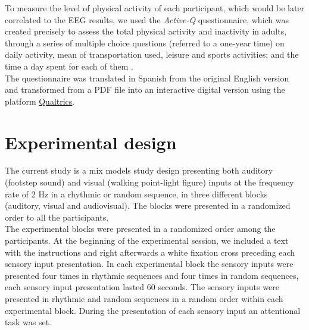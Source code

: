 To measure the level of physical activity of each participant, which would be later correlated to the EEG results, we used the \textit{Active-Q} questionnaire, which was created precisely to assess the total physical activity and inactivity in adults, through a series of multiple choice questions (referred to a one-year time) on daily activity, mean of transportation used, leisure and sports activities; and the time a day spent for each of them \parencite{Bonn_2012}. \\
The questionnaire was translated in Spanish from the original English version and transformed from a PDF file into an interactive digital version using the platform \href{https://www.qualtrics.com/uk/?rid=ip&prevsite=en&newsite=uk&geo=ES&geomatch=uk}{Qualtrics}. 

\section{Experimental design}
The current study is a mix models study design presenting both auditory (footstep sound) and visual (walking point-light figure) inputs at the frequency rate of 2 Hz in a rhythmic or random sequence, in three different blocks (auditory, visual and audiovisual). The blocks were presented in a randomized order to all the participants. \\
The experimental blocks were presented in a randomized order among the participants. At the beginning of the experimental session, we included a text with the instructions and right afterwards a white fixation cross preceding each sensory input presentation. 
In each experimental block the sensory inputs were presented four times in rhythmic sequences and four times in random sequences, each sensory input presentation lasted 60 seconds. The sensory inputs were presented in rhythmic and random sequences in a random order within each experimental block.  During the presentation of each sensory input an attentional task was set. 

